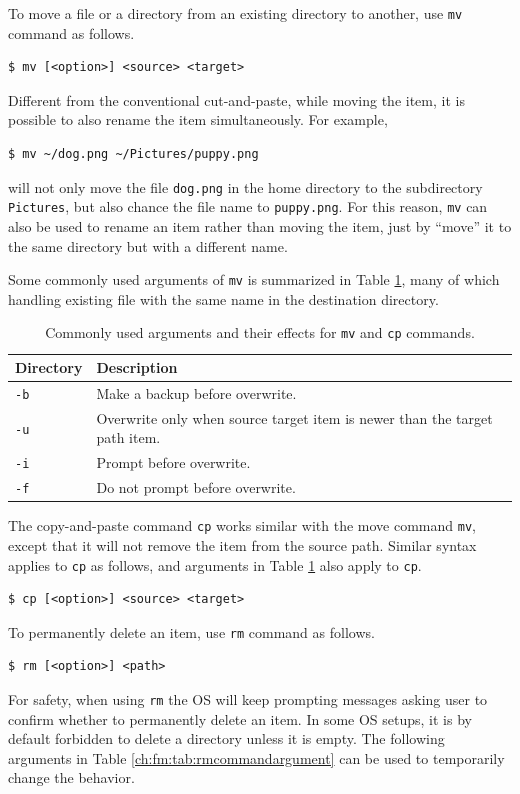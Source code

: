 To move a file or a directory from an existing directory to another, use \verb|mv| command as follows.
\begin{lstlisting}
$ mv [<option>] <source> <target>
\end{lstlisting}
Different from the conventional cut-and-paste, while moving the item, it is possible to also rename the item simultaneously. For example,
\begin{lstlisting}
$ mv ~/dog.png ~/Pictures/puppy.png
\end{lstlisting}
will not only move the file \verb|dog.png| in the home directory to the subdirectory \verb|Pictures|, but also chance the file name to \verb|puppy.png|. For this reason, \verb|mv| can also be used to rename an item rather than moving the item, just by ``move'' it to the same directory but with a different name.

Some commonly used arguments of \verb|mv| is summarized in Table \ref{ch:fm:tab:mvcpcommandargument}, many of which handling existing file with the same name in the destination directory.

\begin{table}[!htb]
  \centering \caption{Commonly used arguments and their effects for \texttt{mv} and \texttt{cp} commands.}\label{ch:fm:tab:mvcpcommandargument}
  \begin{tabularx}{\textwidth}{lX}
    \hline
    Directory & Description \\ \hline
    \verb|-b| & Make a backup before overwrite. \\ 
    \verb|-u| & Overwrite only when source target item is newer than the target path item. \\ 
    \verb|-i| & Prompt before overwrite. \\ 
    \verb|-f| & Do not prompt before overwrite. \\
    \hline
  \end{tabularx}
\end{table}

The copy-and-paste command \verb|cp| works similar with the move command \verb|mv|, except that it will not remove the item from the source path. Similar syntax applies to \verb|cp| as follows, and arguments in Table \ref{ch:fm:tab:mvcpcommandargument} also apply to \verb|cp|.
\begin{lstlisting}
$ cp [<option>] <source> <target>
\end{lstlisting}

To permanently delete an item, use \verb|rm| command as follows.
\begin{lstlisting}
$ rm [<option>] <path>
\end{lstlisting}
For safety, when using \verb|rm| the OS will keep prompting messages asking user to confirm whether to permanently delete an item. In some OS setups, it is by default forbidden to delete a directory unless it is empty. The following arguments in Table \ref{ch:fm:tab:rmcommandargument} can be used to temporarily change the behavior.


